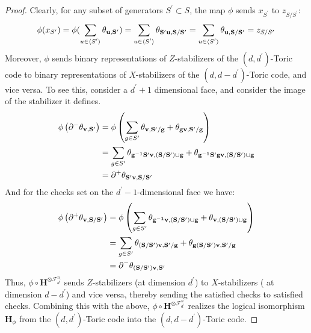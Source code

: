 \begin{proof}
  Clearly, for any subset of generators $S^{\prime} \subset S$, the map $\phi$ sends $x_{S^{\prime}}$ to $z_{S/S^{\prime}}$:
  \begin{equation*}
    \begin{split}
    \phi(x_{S^{\prime}}) = \phi(  \sum_{u \in \expval*{S^{\prime}} }\mathbf{\theta_{u ,S^{\prime}} }   ) =  \sum_{u \in \expval*{S^{\prime}} }\mathbf{\theta_{ S^{\prime} u ,S/S^{\prime}} }  = \sum_{u \in \expval*{S^{\prime}} }\mathbf{\theta_{u ,S/S^{\prime}} } = z_{S/S^{\prime}}
    \end{split}
  \end{equation*}
Moreover, $\phi$ sends binary representations of $Z$-stabilizers of the $(d,d^{\prime})$-Toric code to binary representations of $X$-stabilizers of the $(d,d-d^{\prime})$-Toric code, and vice versa. To see this, consider a $d^{\prime}+1$ dimensional face, and consider the image of the stabilizer it defines.
  \begin{equation*}
    \begin{split}
      \phi \left( \partial^{-}  \mathbf{\theta_{v ,S^{\prime}} } \right) &=  \phi\left( \sum_{g\in S^{\prime}} \mathbf{\theta_{v ,S^{\prime}/g} } +  \mathbf{\theta_{gv ,S^{\prime}/g} }  \right) \\
      & = \sum_{g\in S^{\prime}} \mathbf{\theta_{ g^{-1}  S^{\prime} v ,(S/S^{\prime})\cup g} } +  \mathbf{\theta_{ g^{-1} S^{\prime}  gv ,(S/S^{\prime})\cup g} }  \\ 
      &= \partial^{+} \mathbf{\theta_{ S^{\prime} v ,S/S^{\prime}} }
    \end{split}
  \end{equation*}
  And for the checks set on the $d^{\prime}-1$-dimensional face we have: 
  \begin{equation*}
    \begin{split}
      \phi \left( \partial^{+}  \mathbf{\theta_{v ,S/S^{\prime}} } \right) & =   \phi \left( \sum_{g \in S^{\prime}}\mathbf{\theta_{ g^{-1} v ,(S/S^{\prime}) \cup g} } +   \mathbf{\theta_{    v ,(S/S^{\prime}) \cup g} } \right) \\
      &=  \sum_{g \in S^{\prime}}\mathbf{\theta_{  (S/S^{\prime})    v ,S^{\prime}/g} } +   \mathbf{\theta_{   g (S/S^{\prime})  v ,S^{\prime} / g} } \\
      & =  \partial^{-} \mathbf{\theta_{ (S/S^{\prime}) v ,S^{\prime}} }
    \end{split}
  \end{equation*}
  Thus, $\phi \circ \mathbf{H}^{\otimes\mathcal{F}_{d^\prime}^{n}} $ sends $Z$-stabilizers (at dimension $d^{\prime}$) to $X$-stabilizers ( at dimension $d-d^{\prime}$) and vice versa, thereby sending the satisfied checks to satisfied checks. Combining this with the above, $\phi \circ \mathbf{H}^{\otimes\mathcal{F}_{d^\prime}^{n}}$ realizes the logical isomorphism $\mathbf{H}_{\phi}$ from the $(d,d^{\prime})$-Toric code into the $(d,d-d^{\prime})$-Toric code.
\end{proof}
 



